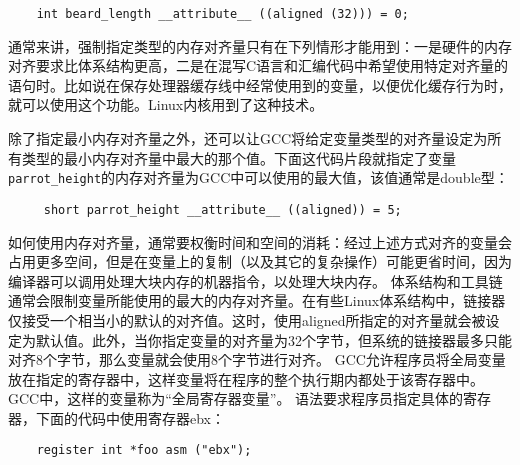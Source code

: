 \begin{lstlisting}
    int beard_length __attribute__ ((aligned (32))) = 0;
\end{lstlisting}
通常来讲，强制指定类型的内存对齐量只有在下列情形才能用到：一是硬件的内存对齐要求比体系结构更高，二是在混写C语言和汇编代码中希望使用特定对齐量的语句时。比如说在保存处理器缓存线中经常使用到的变量，以便优化缓存行为时，就可以使用这个功能。Linux内核用到了这种技术。

除了指定最小内存对齐量之外，还可以让GCC将给定变量类型的对齐量设定为所有类型的最小内存对齐量中最大的那个值。下面这代码片段就指定了变量\verb+parrot_height+的内存对齐量为GCC中可以使用的最大值，该值通常是double型：
\begin{lstlisting}
     short parrot_height __attribute__ ((aligned)) = 5;
\end{lstlisting}
如何使用内存对齐量，通常要权衡时间和空间的消耗：经过上述方式对齐的变量会占用更多空间，但是在变量上的复制（以及其它的复杂操作）可能更省时间，因为编译器可以调用处理大块内存的机器指令，以处理大块内存。
体系结构和工具链通常会限制变量所能使用的最大的内存对齐量。在有些Linux体系结构中，链接器仅接受一个相当小的默认的对齐值。这时，使用aligned所指定的对齐量就会被设定为默认值。此外，当你指定变量的对齐量为32个字节，但系统的链接器最多只能对齐8个字节，那么变量就会使用8个字节进行对齐。
GCC允许程序员将全局变量放在指定的寄存器中，这样变量将在程序的整个执行期内都处于该寄存器中。GCC中，这样的变量称为“全局寄存器变量”。
语法要求程序员指定具体的寄存器，下面的代码中使用寄存器ebx：
\begin{lstlisting}
    register int *foo asm ("ebx");
\end{lstlisting}

